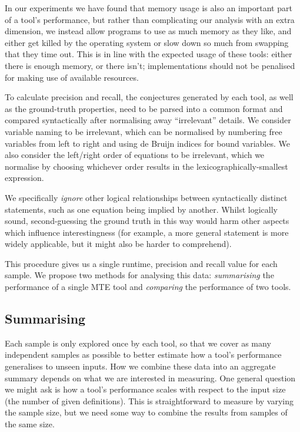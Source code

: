 In our experiments we have found that memory usage is also an important part of
a tool's performance, but rather than complicating our analysis with an extra
dimension, we instead allow programs to use as much memory as they like, and
either get killed by the operating system or slow down so much from swapping
that they time out. This is in line with the expected usage of these tools:
either there is enough memory, or there isn't; implementations should not be
penalised for making use of available resources.

To calculate precision and recall, the conjectures generated by each tool, as
well as the ground-truth properties, need to be parsed into a common format and
compared syntactically after normalising away ``irrelevant'' details. We
consider variable naming to be irrelevant, which can be normalised by numbering
free variables from left to right and using de Bruijn indices for bound
variables. We also consider the left/right order of equations to be irrelevant,
which we normalise by choosing whichever order results in the
lexicographically-smallest expression.

We specifically \emph{ignore} other logical relationships between syntactically
distinct statements, such as one equation being implied by another. Whilst
logically sound, second-guessing the ground truth in this way would harm other
aspects which influence interestingness (for example, a more general statement
is more widely applicable, but it might also be harder to comprehend).

This procedure gives us a single runtime, precision and recall value for each
sample. We propose two methods for analysing this data: \emph{summarising}
the performance of a single MTE tool and \emph{comparing} the performance of two
tools.

\subsection{Summarising}

Each sample is only explored once by each tool, so that we cover as many
independent samples as possible to better estimate how a tool's performance
generalises to unseen inputs. How we combine these data into an aggregate
summary depends on what we are interested in measuring. One general question we
might ask is how a tool's performance scales with respect to the input size (the
number of given definitions). This is straightforward to measure by varying the
sample size, but we need some way to combine the results from samples of the
same size.

